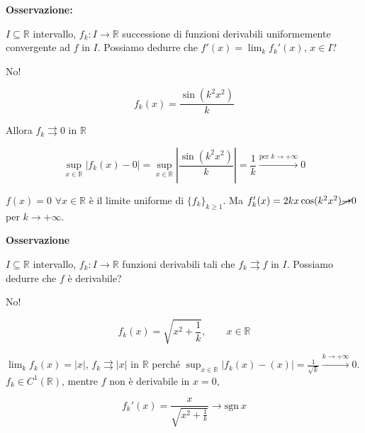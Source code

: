\begin{dembar}
	
\end{dembar}


\textbf{Osservazione:}


$I \subseteq \mathbb{R}$ intervallo, $f_k: I \rightarrow \mathbb{R}$ successione di funzioni derivabili uniformemente convergente ad $f$ in $I$. Possiamo dedurre che $f'(x) = \lim_{k}f_k'(x)$, $x \in I$?

No!

$$f_k(x)=\frac{\sin(k^2x^2)}{k}$$ 

Allora $f_k \rightrightarrows 0$ in $\mathbb{R}$ 

$$\sup_{x \in \mathbb{R}}|f_k(x)-0|= \sup_{x \in \mathbb{R}}|\frac{\sin(k^2x^2)}{k}|= \frac{1}{k}\xrightarrow{\text{per } k \to +\infty} 0$$

$f(x)=0 \,\, \forall x \in \mathbb{R}$ è il limite uniforme di $\{f_k\}_{k\geq 1}$. Ma $f_k'(x)=2kx\cos(k^2x^2)\cancel{\rightarrow} 0$ per $k \rightarrow +\infty$.


\textbf{Osservazione}

$I \subseteq \mathbb{R}$ intervallo, $f_k: I \rightarrow \mathbb{R}$ funzioni derivabili tali che $f_k \rightrightarrows f$ in $I$. Possiamo dedurre che $f$ è derivabile?

No!

$$f_k(x)= \sqrt{x^2+\frac{1}{k}}, \qquad x \in \mathbb{R}$$


$\lim_{k} f_k(x)=|x|$, $f_k \rightrightarrows |x|$ in $\mathbb{R}$ perché $\sup_{x\in \mathbb{R}}|f_k(x)-(x)|= \frac{1}{\sqrt{k}}\xrightarrow{k \rightarrow +\infty}0$. $f_k \in C^1(\mathbb{R})$, mentre $f$ non è derivabile in $x =0$, 

$$f_k' (x) = \frac{x}{\sqrt{x^2+\frac{1}{k}}} \rightarrow \mathrm{sgn} \ x$$
 
